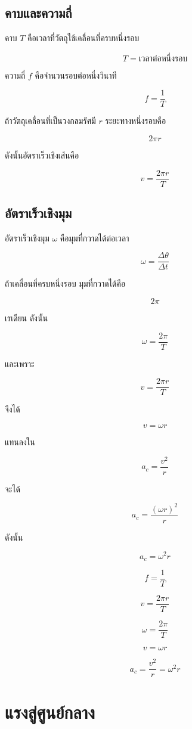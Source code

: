 \subsection{คาบและความถี่}

คาบ $T$ คือเวลาที่วัตถุใช้เคลื่อนที่ครบหนึ่งรอบ

\[
T=\text{เวลาต่อหนึ่งรอบ}
\]

ความถี่ $f$ คือจำนวนรอบต่อหนึ่งวินาที

\[
f=\frac{1}{T}
\]

ถ้าวัตถุเคลื่อนที่เป็นวงกลมรัศมี $r$ ระยะทางหนึ่งรอบคือ

\[
2\pi r
\]

ดังนั้นอัตราเร็วเชิงเส้นคือ

\[
v=\frac{2\pi r}{T}
\]

\subsection{อัตราเร็วเชิงมุม}

อัตราเร็วเชิงมุม $\omega$ คือมุมที่กวาดได้ต่อเวลา

\[
\omega=\frac{\Delta\theta}{\Delta t}
\]

ถ้าเคลื่อนที่ครบหนึ่งรอบ มุมที่กวาดได้คือ

\[
2\pi
\]

เรเดียน ดังนั้น

\[
\omega=\frac{2\pi}{T}
\]

และเพราะ

\[
v=\frac{2\pi r}{T}
\]

จึงได้

\[
v=\omega r
\]

แทนลงใน

\[
a_c=\frac{v^2}{r}
\]

จะได้

\[
a_c=\frac{(\omega r)^2}{r}
\]

ดังนั้น

\[
a_c=\omega^2r
\]

\begin{tcolorbox}[title=สูตรพื้นฐานของการเคลื่อนที่เป็นวงกลม]
\[
f=\frac{1}{T}
\]

\[
v=\frac{2\pi r}{T}
\]

\[
\omega=\frac{2\pi}{T}
\]

\[
v=\omega r
\]

\[
a_c=\frac{v^2}{r}=\omega^2r
\]
\end{tcolorbox}

\section{แรงสู่ศูนย์กลาง}

